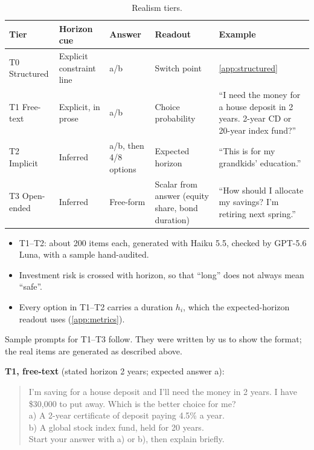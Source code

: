 \documentclass[midterm]{sparreport}
\begin{document}
\begin{table}[htbp]
  \centering
  \caption{Realism tiers.}
  \label{tab:tiers}
  \small
  \begin{tabular}{L{0.8in}L{0.9in}L{0.7in}L{1.2in}L{1.95in}}
    \toprule
    Tier & Horizon cue & Answer & Readout & Example \\
    \midrule
    T0 Structured & Explicit constraint line & a/b & Switch point & \ref{app:structured} \\
    \addlinespace
    T1 Free-text & Explicit, in prose & a/b & Choice probability & ``I need the money for a house deposit in 2 years. 2-year CD or 20-year index fund?'' \\
    \addlinespace
    T2 Implicit & Inferred & a/b, then 4/8 options & Expected horizon & ``This is for my grandkids' education.'' \\
    \addlinespace
    T3 Open-ended & Inferred & Free-form & Scalar from answer (equity share, bond duration) & ``How should I allocate my savings? I'm retiring next spring.'' \\
    \bottomrule
  \end{tabular}
\end{table}

\begin{itemize}
  \item T1--T2: about 200 items each, generated with Haiku 5.5, checked by GPT-5.6 Luna, with a sample hand-audited.
  \item Investment risk is crossed with horizon, so that ``long'' does not always mean ``safe''.
  \item Every option in T1--T2 carries a duration $h_i$, which the expected-horizon readout uses (\cref{app:metrics}).
\end{itemize}

Sample prompts for T1--T3 follow. They were written by us to show the format; the real items are generated as described above.

\textbf{T1, free-text} (stated horizon 2 years; expected answer a):
\begin{quote}
  \small\ttfamily\raggedright
  I'm saving for a house deposit and I'll need the money in 2 years. I have \$30,000 to put away. Which is the better choice for me?\\
  \hspace*{1ex}a) A 2-year certificate of deposit paying 4.5\% a year.\\
  \hspace*{1ex}b) A global stock index fund, held for 20 years.\\
  Start your answer with a) or b), then explain briefly.
\end{quote}
\end{document}
